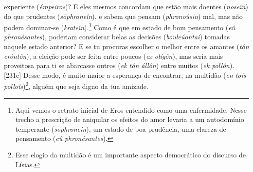 experiente (\emph{émpeiros})? E eles mesmos concordam que estão mais
doentes (\emph{noseîn}) do que prudentes (\emph{sōphroneîn}), e sabem
que pensam (\emph{phronoûsin}) mal, mas não podem dominar-se
(\emph{krateîn}).\footnote{Aqui vemos o retrato inicial de Eros
  entendido como uma enfermidade. Nesse trecho a prescrição de aniquilar
  os efeitos do amor levaria a um autodomínio temperante
  (\emph{sophroneîn}), um estado de boa prudência, uma clareza de
  pensamento (\emph{eû} \emph{phronésantes}).} Como é que em estado de
bom pensamento (\emph{eû} \emph{phronésantes}), poderiam considerar
belas as decisões (\emph{bouleúontai}) tomadas naquele estado anterior?
E se tu procuras escolher o melhor entre os amantes (\emph{tôn
eróntôn}), a eleição pode ser feita entre poucos (\emph{ex olígôn}), mas
seria mais proveitosa para ti se abarcasse outros (\emph{ek tôn állôn})
entre muitos (\emph{ek pollôn}). {[}231e{]} Desse modo, é muito maior a
esperança de encontrar, na multidão (\emph{en tois polloîs})\footnote{Esse
  elogio da multidão é um importante aspecto democrático do discurso de
  Lísias.}, alguém que seja digno da tua amizade.

